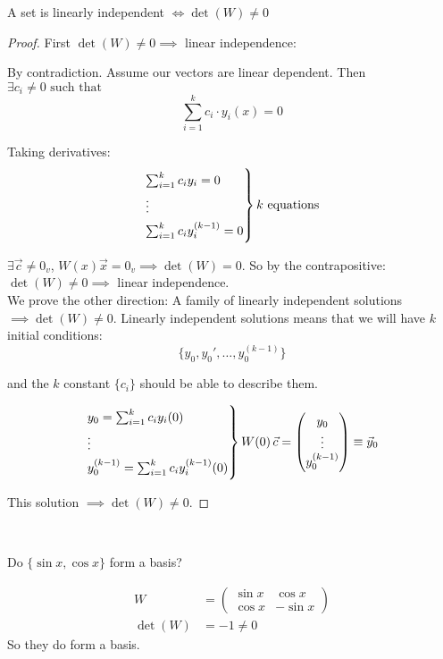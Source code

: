 \documentclass[10pt]{scrartcl}
\begin{document}
\begin{theorem}
A set is linearly independent $\iff \det(W) \neq 0$	
\end{theorem}
\begin{proof}

First $\det(W) \neq 0 \implies$ linear independence: 

By contradiction. Assume our vectors are linear dependent. Then $\exists c_i \neq 0 \mbox{ such that }$
 \[ \sum_{i=1}^k c_i\cdot y_i(x) = 0\]
 
 Taking derivatives: 
 \[\begin{rcases*}
\sum_{i=1}^k c_iy_i = 0\\
\vdots\\
\sum_{i=1}^k c_iy_i^{(k-1)} = 0	
\end{rcases*} k \text{ equations}
\]

$\exists \vec{c} \neq 0_v$, $W(x)\vec{x} = 0_v \implies \det(W) = 0$. So by the contrapositive: $\det(W) \neq 0 \implies$ linear independence.\\

We prove the other direction: A family of linearly independent solutions $\implies \det(W) \neq 0$. Linearly independent solutions means that we will have $k$ initial conditions: 
\[\{y_0, y_0',\dots,y_0^{(k-1)}\}\]

and the $k$ constant $\{c_i\}$ should be able to describe them. 

	 \[\begin{rcases*}
y_0 = \sum_{i=1}^k c_iy_i(0) \\
\vdots\\
y_0^{(k-1)} = \sum_{i=1}^k c_iy_i^{(k-1)}(0)	
\end{rcases*} W(0)\,\vec{c} = \begin{pmatrix}
 y_0 \\ \vdots\\ y_0^{(k-1)}
 \end{pmatrix} \equiv \vec{y}_0	
\]

This solution $\implies \det(W) \neq 0$. 
\end{proof}~

\begin{example}
Do $\{\sin x,\cos x\}$ form a basis? 

\[
\begin{aligned}
  W &= \begin{pmatrix}
 \sin x & \cos x\\
 \cos x & -\sin x	
 \end{pmatrix}\\
 \det(W) &= -1 \neq 0
\end{aligned}
\]
So they do form a basis.
\end{example}
\end{document}

